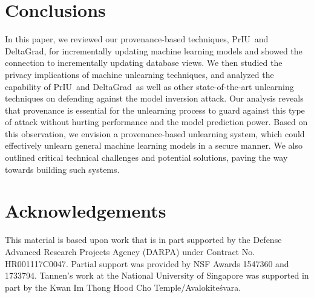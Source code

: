 \documentclass[11pt]{article}
\newcommand{\priu}{PrIU}
\newcommand{\deltagrad}{DeltaGrad}
\begin{document}






% 


% 
\section{Conclusions}
In this paper, we reviewed our provenance-based techniques, \priu\ and \deltagrad, for incrementally updating machine learning models and showed the connection to incrementally updating database views.  We then studied the privacy implications of machine unlearning techniques, and analyzed the capability of \priu\ and \deltagrad\ as well as other state-of-the-art unlearning techniques on defending against the model inversion attack.  Our analysis reveals that provenance is essential for the unlearning process to guard against this type of attack without hurting performance and the model prediction power. Based on this observation, we envision a provenance-based unlearning system, which could effectively unlearn general machine learning models in a secure manner. We also outlined critical technical challenges and potential solutions, paving the way towards building such systems.

\section*{Acknowledgements}

This material is based upon work that is in part supported by the Defense Advanced Research Projects Agency (DARPA) under Contract No. HR001117C0047.  Partial support was provided by NSF Awards 1547360 and 1733794. Tannen's work at the National University of Singapore was supported in part by the Kwan Im Thong Hood Cho Temple/Avalokite\'{s}vara.


\end{document}
